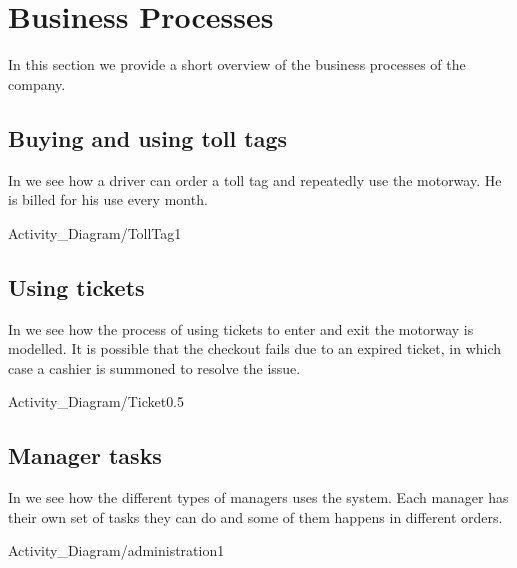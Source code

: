 \section{Business Processes}
In this section we provide a short overview of the business processes of the company.

\subsection{Buying and using toll tags}
\madeby{\af}{\mb}
In  we see how a driver can order a toll tag and repeatedly use the motorway. He is billed for his use every month.

\begin{myfigure}{Activity_Diagram/TollTag}{1}
\caption{Activity diagram for buying and using toll tags. \madeby{\af}{\mb}}
\label{fig:act-tolltag}
\end{myfigure}

\subsection{Using tickets}
\madeby{\jb}{\mt}
In  we see how the process of using tickets to enter and exit the motorway is modelled. It is possible that the checkout fails due to an expired ticket, in which case a cashier is summoned to resolve the issue.

\begin{myfigure}{Activity_Diagram/Ticket}{0.5}
\caption{Activity diagram for buying and using tickets. \madeby{\jb}{\mt}}
\label{fig:act-ticket}
\end{myfigure}

\subsection{Manager tasks}
\madeby{\af}{\kj}
In  we see how the different types of managers uses the system. Each manager has their own set of tasks they can do and some of them happens in different orders.

\begin{myfigure}{Activity_Diagram/administration}{1}
\caption{Activity diagram for managing the system. \madeby{\af}{\kj}}
\label{fig:act-manager}
\end{myfigure}

